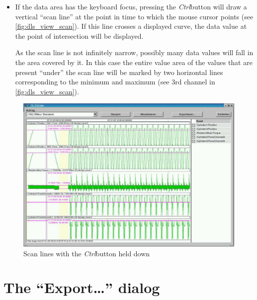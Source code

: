 \documentclass[a4paper,12pt,BCOR6mm,bibtotoc,idxtotoc]{scrbook}
\begin{document}
\begin{itemize}
\item If the data area has the keyboard focus, pressing the
\textit{Ctrl}button will draw a vertical ``scan line'' at the point in time to
which the mouse cursor points (see \autoref{fig:dls_view_scan}). If this line
crosses a displayed curve, the data value at the point of intersection will be
displayed.

As the scan line is not infinitely narrow, possibly many data values will fall
in the area covered by it. In this case the entire value area of the values
that are present ``under'' the scan line will be marked by two horizontal
lines corresponding to the minimum and maximum (see 3rd channel in
\autoref{fig:dls_view_scan}).

\end{itemize}

\begin{figure}[tbh] \begin{center} \includegraphics[width=\textwidth]{bilder/view_scan} \end{center} \caption{Scan lines with the \textit{Ctrl}button held down} \label{fig:dls_view_scan} \end{figure}


\section{The ``Export\ldots'' dialog} \label{sec:view_export}
\end{document}
